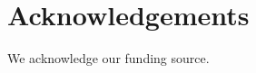 \documentclass[twoside,twocolumn,9pt]{article}
\begin{document}





\endgroup


\section*{Acknowledgements}
We acknowledge our funding source.



\end{document}
